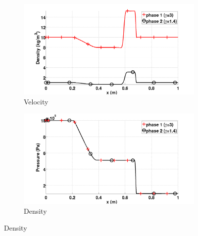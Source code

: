 \documentclass[preprint,10pt]{elsarticle}
\begin{document}
\begin{figure}[H]
        \centering
        \begin{subfigure}[b]{0.495\textwidth}
                \centering
                \includegraphics[width=\textwidth]{figures/relaxation_two_phases_density.png}
                \caption{Velocity}
                \label{fig:adv-vf-vel}
        \end{subfigure}%
        \begin{subfigure}[b]{0.495\textwidth}
                \centering
                \includegraphics[width=\textwidth]{figures/relaxation_two_phases_pressure.png}
                \caption{Density}
                \label{fig:adv-vf-density}
        \end{subfigure}
        

\end{figure}
\end{document}
